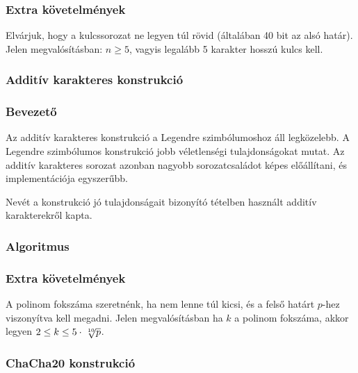 \documentclass[hidelinks, 12pt]{article}
\begin{document}
	\subsubsection*{Extra követelmények}
	Elvárjuk, hogy a kulcssorozat ne legyen túl rövid (általában 40 bit az alsó határ). Jelen megvalósításban: $n \geq 5$, vagyis legalább 5 karakter hosszú kulcs kell.
	\subsubsection{Additív karakteres konstrukció}
	\subsubsection*{Bevezető}
	Az additív karakteres konstrukció a Legendre szimbólumoshoz áll legközelebb. A Legendre szimbólumos konstrukció jobb véletlenségi tulajdonságokat mutat. Az additív karakteres sorozat azonban nagyobb sorozatcsaládot képes előállítani, és implementációja egyszerűbb.
	
	Nevét a konstrukció jó tulajdonságait bizonyító tételben használt additív karakterekről kapta.
	\subsubsection*{Algoritmus}
	\subsubsection*{Extra követelmények}
	A polinom fokszáma szeretnénk, ha nem lenne túl kicsi, és a felső határt $p$-hez viszonyítva kell megadni. Jelen megvalósításban ha $k$ a polinom fokszáma, akkor legyen $2 \leq k \leq 5\cdot\sqrt[\leftroot{-2}\uproot{2}10]{p}$.
	\subsubsection{ChaCha20 konstrukció}
\end{document}
